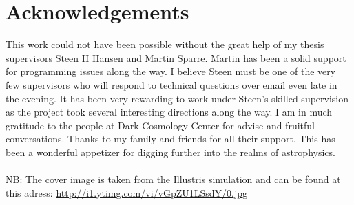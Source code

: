 \section*{Acknowledgements}
This work could not have been possible without the great help of my thesis supervisors Steen H Hansen and Martin Sparre. Martin has been a solid support for programming issues along the way. I believe Steen must be one of the very few supervisors who will respond to technical questions over email even late in the evening.
It has been very rewarding to work under Steen's skilled supervision as the project took several interesting directions along the way.
I am in much gratitude to the people at Dark Cosmology Center for advise and fruitful conversations.
Thanks to my family and friends for all their support. This has been a wonderful appetizer for digging further into the realms of astrophysics. \\ \\
NB: The cover image is taken from the Illustris simulation and can be found at this adress: 
\url{http://i1.ytimg.com/vi/vGpZU1LSsdY/0.jpg}